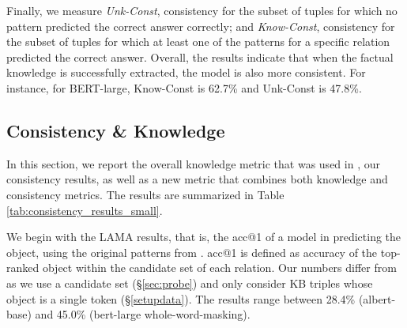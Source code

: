 Finally, we measure \emph{Unk-Const}, consistency  for the subset of tuples
for which no pattern predicted the correct answer correctly;
and \emph{Know-Const},
consistency for the subset of tuples for which
at least one of the patterns for a specific
relation predicted the correct answer.
Overall, the results indicate that when the factual knowledge is successfully extracted, the model is also more consistent.
For instance, for BERT-large, Know-Const  is 62.7\% and Unk-Const is 47.8\%. 


\subsection{Consistency \& Knowledge}
 In this section, we report
the overall knowledge metric that was used in \citet{lama},
our consistency results, as well as a new metric that
combines both knowledge and consistency metrics.  The
results are summarized in Table
\ref{tab:consistency_results_small}.

We begin with the LAMA results, that is, the acc@1 of a
model in predicting the object, using the original patterns
from \citet{lama}. acc@1 is defined as accuracy of the
top-ranked object within the candidate set of each
relation. Our numbers differ from \citet{lama} as we use a
candidate set (\S\ref{sec:probe}) and only consider KB
triples whose object is a single token
(\S\ref{setupdata}). The results range between 28.4\%
(albert-base) and 45.0\% (bert-large whole-word-masking).

